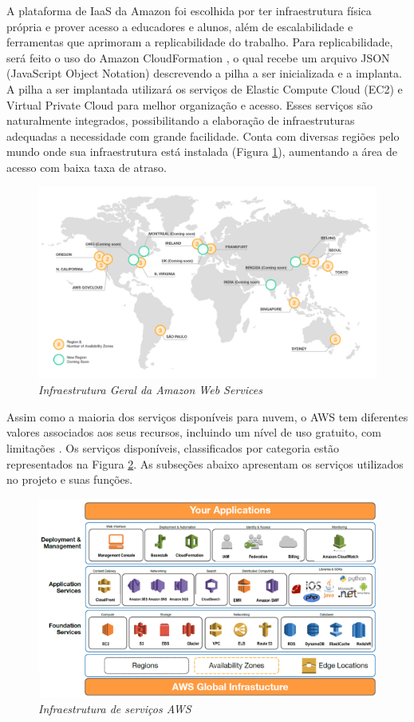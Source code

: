 \documentclass[tg]{mdtufsm}
\begin{document}
A plataforma de IaaS da Amazon foi escolhida por ter infraestrutura física própria e prover acesso a educadores e alunos, além de escalabilidade e ferramentas que aprimoram a replicabilidade do trabalho. Para replicabilidade, será feito o uso do Amazon CloudFormation \cite{awscf}, o qual recebe um arquivo JSON (JavaScript Object Notation) descrevendo a pilha a ser inicializada e a implanta. A pilha a ser implantada utilizará os serviços de Elastic Compute Cloud (EC2)\cite{awsec2} e Virtual Private Cloud\cite{vpc} para melhor organização e acesso. Esses serviços são naturalmente integrados, possibilitando a elaboração de infraestruturas adequadas a necessidade com grande facilidade. Conta com diversas regiões pelo mundo onde sua infraestrutura está instalada (Figura \ref{fig:awsInfra}), aumentando a área de acesso com baixa taxa de atraso.

\begin{figure}
	\centering
	\includegraphics[width=1\textwidth]{aws-infrastructure}
	\caption{\emph{Infraestrutura Geral da Amazon Web Services \cite{awsinfra}}}
	\label{fig:awsInfra}
\end{figure}

Assim como a maioria dos serviços disponíveis para nuvem, o AWS tem diferentes valores associados aos seus recursos, incluindo um nível de uso gratuito, com limitações \cite{ec2price}. Os serviços disponíveis, classificados por categoria estão representados na Figura \ref{fig:awsArq}. As subseções abaixo apresentam os serviços utilizados no projeto e suas funções.

\begin{figure}
	\centering
	\includegraphics[width=1\textwidth]{aws-arq}
	\caption{\emph{Infraestrutura de serviços AWS \cite{awsarq}}}
	\label{fig:awsArq}
\end{figure}
\end{document}
